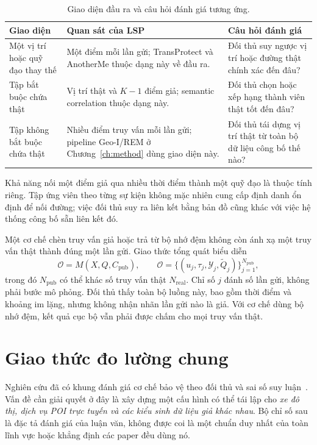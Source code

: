 \documentclass[12pt,a4paper,oneside]{report}
\begin{document}
\begin{table}[htbp]
\centering\small
\caption{Giao diện đầu ra và câu hỏi đánh giá tương ứng.}
\label{tab:interfaces}
\begin{tabularx}{\textwidth}{P{3.1cm}Y Y}
\toprule
\textbf{Giao diện} & \textbf{Quan sát của LSP} & \textbf{Câu hỏi đánh giá}\\
\midrule
Một vị trí hoặc quỹ đạo thay thế & Một điểm mỗi lần gửi; TransProtect và AnotherMe thuộc dạng này về đầu ra. & Đối thủ suy ngược vị trí hoặc đường thật chính xác đến đâu?\\
\addlinespace
Tập bắt buộc chứa thật & Vị trí thật và $K-1$ điểm giả; semantic correlation thuộc dạng này. & Đối thủ chọn hoặc xếp hạng thành viên thật tốt đến đâu?\\
\addlinespace
Tập không bắt buộc chứa thật & Nhiều điểm truy vấn mỗi lần gửi; pipeline Geo-I/REM ở Chương~\ref{ch:method} dùng giao diện này. & Đối thủ tái dựng vị trí thật từ toàn bộ dữ liệu công bố thế nào?\\
\bottomrule
\end{tabularx}
\end{table}

Khả năng nối một điểm giả qua nhiều thời điểm thành một quỹ đạo là thuộc tính riêng. Tập ứng viên theo từng sự kiện không mặc nhiên cung cấp định danh ổn định để nối đường; việc đối thủ suy ra liên kết bằng bản đồ cũng khác với việc hệ thống công bố sẵn liên kết đó.

Một cơ chế chèn truy vấn giả hoặc trả từ bộ nhớ đệm không còn ánh xạ một truy vấn thật thành đúng một lần gửi. Giao thức tổng quát biểu diễn
\[
\mathcal O=M(X,Q,C_{\mathrm{pub}}),\qquad
\mathcal O=\{(u_j,\tau_j,\mathcal Y_j,\widetilde Q_j)\}_{j=1}^{N_{\mathrm{pub}}},
\]
trong đó $N_{\mathrm{pub}}$ có thể khác số truy vấn thật $N_{\mathrm{real}}$. Chỉ số $j$ đánh số lần gửi, không phải bước mô phỏng. Đối thủ thấy toàn bộ luồng này, bao gồm thời điểm và khoảng im lặng, nhưng không nhận nhãn lần gửi nào là giả. Với cơ chế dùng bộ nhớ đệm, kết quả cục bộ vẫn phải được chấm cho mọi truy vấn thật.

\section{Giao thức đo lường chung}
\label{sec:common-metrics}

Nghiên cứu đã có khung đánh giá cơ chế bảo vệ theo đối thủ và sai số suy luận~\citep{shokri2011quantifying}. Vấn đề cần giải quyết ở đây là xây dựng một cấu hình có thể tái lập cho \emph{xe đô thị, dịch vụ POI trực tuyến và các kiểu sinh dữ liệu giả khác nhau}. Bộ chỉ số sau là đặc tả đánh giá của luận văn, không được coi là một chuẩn duy nhất của toàn lĩnh vực hoặc khẳng định các paper đều dùng nó.
\end{document}
